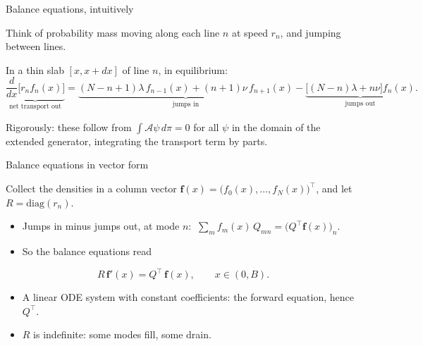 \documentclass[aspectratio=169]{beamer}
\newenvironment*{myitem}[1][1.5em]{\begin{itemize}\setlength{\itemsep}{#1}}{\end{itemize}}
\begin{document}
\begin{frame}{Balance equations, intuitively}

	Think of probability mass moving along each line $n$ at speed $r_n$, and jumping between lines.

	\medskip

	In a thin slab $[x,x+dx]$ of line $n$, in equilibrium:
	\begin{equation*}
		\underbrace{\frac{d}{dx}\big[r_n f_n(x)\big]}_{\text{net transport out}}
		= \underbrace{(N-n+1)\lambda\, f_{n-1}(x) + (n+1)\nu\, f_{n+1}(x)}_{\text{jumps in}}
		- \underbrace{\big[(N-n)\lambda + n\nu\big] f_n(x)}_{\text{jumps out}} .
	\end{equation*}

	\vfill

	{\footnotesize Rigorously: these follow from $\int\mathcal A\psi\,d\pi=0$ for all $\psi$ in the domain of the extended generator, integrating the transport term by parts.}
\end{frame}

\begin{frame}{Balance equations in vector form}

	Collect the densities in a \alert{column} vector $\mathbf f(x)=\big(f_0(x),\ldots,f_N(x)\big)^\top$, and let $R=\mathrm{diag}(r_n)$.

	\medskip

	\begin{myitem}
		\item Jumps in minus jumps out, at mode $n$: $\ \sum_m f_m(x)\,Q_{mn} = \big(Q^\top\mathbf f(x)\big)_n$.
		\pause
		\item So the balance equations read
	\end{myitem}
	\begin{block}{}
		\begin{equation*}
			R\,\mathbf f'(x) = Q^\top\,\mathbf f(x), \qquad x\in(0,B).
		\end{equation*}
	\end{block}
	

	\medskip
	\begin{myitem}
		\item A linear ODE system with constant coefficients: the \alert{forward} equation, hence $Q^\top$.
		\item $R$ is \alert{indefinite}: some modes fill, some drain.
	\end{myitem}
\end{frame}
\end{document}
